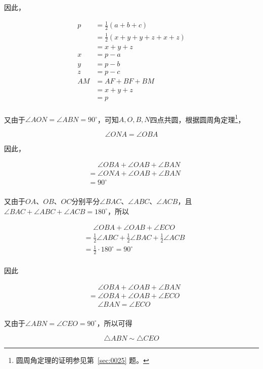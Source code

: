 因此，

\begin{align*}
  p &= \frac12(a + b + c) \\
  &= \frac12(x + y + y + z + x + z) \\
  &= x + y + z \\
  x &= p - a \\
  y &= p - b \\
  z &= p - c \\
  AM &= AF + BF + BM \\
  &= x + y + z \\
  &= p \\
\end{align*}

又由于$\angle AON = \angle ABN = 90^\circ$，可知$A, O, B, N$四点共圆，根据圆周角定理\footnote{圆周角定理的证明参见第~\ref{sec:0025} 题。}，

\[ \angle ONA = \angle OBA \]

因此，

\begin{align*}
  &\phantom{=} \angle OBA + \angle OAB + \angle BAN \\
  &= \angle ONA + \angle OAB + \angle BAN \\
  &= 90^\circ \\
\end{align*}

又由于$OA$、$OB$、$OC$分别平分$\angle BAC$、$\angle ABC$、$\angle ACB$，且$\angle BAC + \angle ABC + \angle ACB = 180^\circ$，所以

\begin{align*}
  &\phantom{=} \angle OBA + \angle OAB + \angle ECO \\
  &= \frac12\angle ABC + \frac12\angle BAC + \frac12\angle ACB \\
  &= \frac12\cdot 180^\circ = 90^\circ \\
\end{align*}

因此

\begin{align*}
  &\phantom{=} \angle OBA + \angle OAB + \angle BAN \\
  &=\angle OBA + \angle OAB + \angle ECO \\
  &\phantom{=} \angle BAN = \angle ECO \\
\end{align*}

又由于$\angle ABN = \angle CEO = 90^\circ$，所以可得

\[ \triangle ABN \sim \triangle CEO \]

